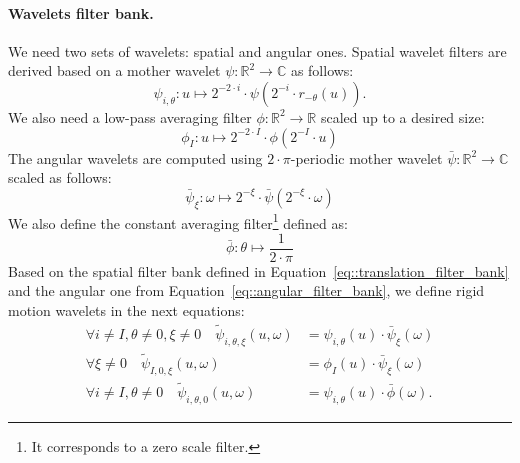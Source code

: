             \paragraph{Wavelets filter bank.}
                We need two sets of wavelets: spatial and angular ones.
                Spatial wavelet filters are derived based on a mother wavelet $\psi: \mathbb{R}^2 \rightarrow \mathbb{C}$ as follows:
                \begin{equation}
                    \label{eq::translation_filter_bank}
                    \psi_{i,\theta} : u\mapsto 2^{-2\cdot i}\cdot\psi\left(2^{-i}\cdot r_{-\theta}(u)\right).
                \end{equation}
                We also need a low-pass averaging filter $\phi: \mathbb{R}^2 \rightarrow \mathbb{R}$ scaled up to a desired size:
                \begin{equation}
                    \label{eq::translation_low_pass}
                    \phi_I: u\mapsto 2^{-2\cdot I}\cdot\phi\left(2^{-I}\cdot u\right)
                \end{equation}
                The angular wavelets are computed using $2\cdot\pi$-periodic mother wavelet $\bar\psi: \mathbb{R}^2 \rightarrow \mathbb{C}$ scaled as follows:
                \begin{equation}
                    \label{eq::angular_filter_bank}
                    \bar\psi_{\xi}: \omega \mapsto 2^{-\xi}\cdot\bar\psi\left(2^{-\xi}\cdot \omega\right)
                \end{equation}
                We also define the constant averaging filter\footnote{It corresponds to a zero scale filter.} defined as:
                \begin{equation}
                    \label{eq::angular_low_pass}
                    \bar\phi: \theta \mapsto \frac{1}{2\cdot\pi}
                \end{equation}
                Based on the spatial filter bank defined in Equation~\ref{eq::translation_filter_bank} and the angular one from Equation~\ref{eq::angular_filter_bank}, we define rigid motion wavelets in the next equations:
                \begin{align}
                    \label{eq::roto-translation_filter_bank}
                    \forall i\neq I, \theta \neq 0, \xi \neq 0 \quad \tilde{\psi}_{i, \theta, \xi}(u, \omega) &= \psi_{i,\theta}(u) \cdot \bar\psi_{\xi}(\omega)\\
                    \forall \xi \neq 0 \quad \tilde{\psi}_{I, 0, \xi}(u, \omega) &= \phi_I(u) \cdot \bar\psi_{\xi}(\omega)\\
                    \forall i\neq I, \theta \neq 0 \quad \tilde{\psi}_{i, \theta, 0}(u, \omega) &= \psi_{i,\theta}(u) \cdot \bar\phi(\omega).
                \end{align}
